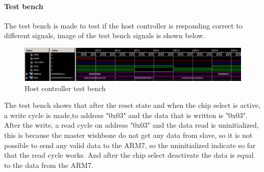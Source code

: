 \paragraph{Test bench}
The test bench is made to test if the host controller is responding correct to different signals, image of the test bench signals is shown below.
\begin{figure}[H]
	\begin{centering}
		 \includegraphics[width=1.0\textwidth]{content/appendix/eudp/images/host_controller_tb.png}
		\caption{Host controller test bench}
	\end{centering}
\end{figure}
The test bench shows that after the reset state and when the chip select is active, a write cycle is made,to address "0x03" and the data that is written is "0x03". After the write, a read cycle on address "0x03" and the data read is uninitialized, this is because the master wishbone do not get any data from slave, so it is not possible to send any valid data to the ARM7, so the uninitialized indicate so far that the read cycle works. And after the chip select deactivate the data is equal to the data from the ARM7.

